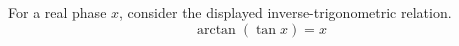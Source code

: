\documentclass{article}
\begin{document}
For a real phase $x$, consider the displayed inverse-trigonometric relation.
\begin{equation}
  \arctan(\tan x)=x
\end{equation}
\end{document}
